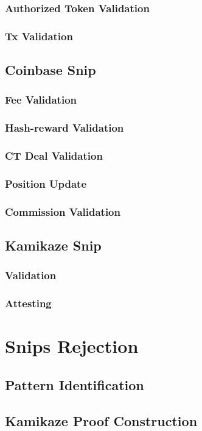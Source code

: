 \documentclass[a4paper,11pt]{article}
\begin{document}
\subsubsection{Authorized Token Validation}
\subsubsection{Tx Validation}
\subsection{Coinbase Snip}
\subsubsection{Fee Validation}
\subsubsection{Hash-reward Validation}
\subsubsection{CT Deal Validation}
\subsubsection{Position Update}
\subsubsection{Commission Validation}
\subsection{Kamikaze Snip}
\subsubsection{Validation}
\subsubsection{Attesting}


\section{Snips Rejection}
\subsection{Pattern Identification}
\subsection{Kamikaze Proof Construction}
\end{document}
